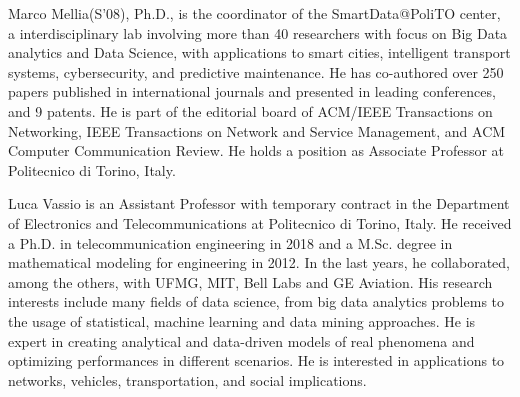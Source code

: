 \begin{IEEEbiography} {Marco Mellia}(S'08), Ph.D., is the coordinator of the SmartData@PoliTO center, a interdisciplinary lab involving more than 40 researchers with focus on Big Data analytics and Data Science, with applications to smart cities, intelligent transport systems, cybersecurity, and predictive maintenance.
He has co-authored over 250 papers published in international journals and presented in leading conferences, and 9 patents.
He is part of the editorial board of ACM/IEEE Transactions on Networking, IEEE Transactions on Network and Service Management, and ACM Computer Communication Review.
He holds a position as Associate Professor at Politecnico di Torino, Italy.
\end{IEEEbiography}

\begin{IEEEbiography} {Luca Vassio} is an Assistant Professor with temporary contract in the Department of Electronics and Telecommunications at Politecnico di Torino, Italy. He received a Ph.D. in telecommunication engineering in 2018 and a M.Sc. degree in mathematical modeling for engineering in 2012. In the last years, he collaborated, among the others, with  UFMG, MIT, Bell Labs and GE Aviation.
His research interests include  many fields of data science, from big data analytics problems to the usage of statistical, machine learning and data mining approaches. He is expert in creating analytical and data-driven models of real phenomena and optimizing performances in different scenarios. He is interested in applications to networks, vehicles,  transportation, and social implications.
\end{IEEEbiography}